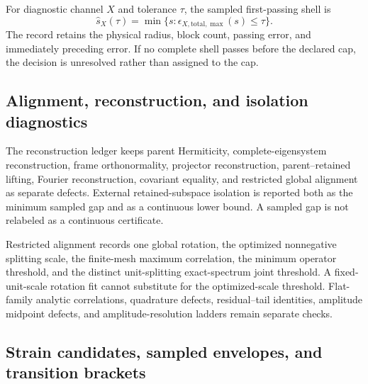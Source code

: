 For diagnostic channel $X$ and tolerance $\tau$, the sampled first-passing shell is
\begin{equation}
 \widehat s_X(\tau)=
 \min\{s:\epsilon_{X,\mathrm{total},\max}(s)\le\tau\}.
 \label{eq:app-first-passing}
\end{equation}
The record retains the physical radius, block count, passing error, and immediately
preceding error. If no complete shell passes before the declared cap, the decision is
unresolved rather than assigned to the cap.

\subsection{Alignment, reconstruction, and isolation diagnostics}

The reconstruction ledger keeps parent Hermiticity, complete-eigensystem reconstruction,
frame orthonormality, projector reconstruction, parent--retained lifting, Fourier
reconstruction, covariant equality, and restricted global alignment as separate
defects. External retained-subspace isolation is reported both as the minimum sampled
gap and as a continuous lower bound. A sampled gap is not relabeled as a continuous
certificate.

Restricted alignment records one global rotation, the optimized nonnegative splitting
scale, the finite-mesh maximum correlation, the minimum operator threshold, and the
distinct unit-splitting exact-spectrum joint threshold. A fixed-unit-scale rotation fit
cannot substitute for the optimized-scale threshold. Flat-family analytic correlations,
quadrature defects, residual--tail identities, amplitude midpoint defects, and
amplitude-resolution ladders remain separate checks.

\subsection{Strain candidates, sampled envelopes, and transition brackets}

